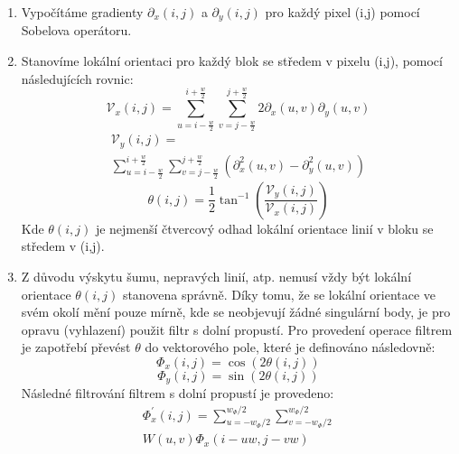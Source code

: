 \documentclass[a4paper,11pt]{article}
\begin{document}
\begin{multicols*}{2}
\begin{enumerate}
            \item Vypočítáme gradienty $\partial_{x}(i, j)$ a $\partial_{y}(i, j)$ pro každý pixel (i,j) pomocí Sobelova operátoru.
            \item Stanovíme lokální orientaci pro každý blok se středem v pixelu (i,j), pomocí následujících rovnic:
                \begin{equation} 
                    \mathcal{V}_{x}(i, j)=\sum_{u=i-\frac{w}{2}}^{i+\frac{w}{2}} \sum_{v=j-\frac{w}{2}}^{j+\frac{w}{2}} 2 \partial_{x}(u, v) \partial_{y}(u, v)
                \end{equation}
                \begin{equation} 
                    \begin{multlined}
                        \mathcal{V}_{y}(i, j)=\\\sum_{u=i-\frac{w}{2}}^{i+\frac{w}{2}} \sum_{v=j-\frac{w}{2}}^{j+\frac{w}{2}}\left(\partial_{x}^{2}(u, v)-\partial_{y}^{2}(u, v)\right)
                    \end{multlined}
                \end{equation}
                \begin{equation} 
                    \theta(i, j)=\frac{1}{2} \tan ^{-1}\left(\frac{\mathcal{V}_{y}(i, j)}{\mathcal{V}_{x}(i, j)}\right)
                \end{equation}
                 Kde $\theta(i, j)$ je nejmenší čtvercový odhad lokální orientace linií v bloku se středem v (i,j).
             \item Z důvodu výskytu šumu, nepravých linií, atp. nemusí vždy být lokální orientace $\theta(i, j)$ stanovena správně. Díky tomu, že se lokální orientace ve svém okolí mění pouze mírně, kde se neobjevují žádné singulární body, je pro opravu (vyhlazení) použit filtr s dolní propustí. Pro provedení operace filtrem je zapotřebí převést $\theta$ do vektorového pole, které je definováno následovně:
             \begin{equation}
                 \Phi_{x}(i, j)=\cos (2 \theta(i, j))
            \end{equation}   
            \begin{equation}
                 \Phi_{y}(i, j)=\sin (2 \theta(i, j))
             \end{equation}
             Následné filtrování filtrem s dolní propustí je provedeno:
             \begin{equation}
                 \begin{multlined}
                     \Phi_{x}^{\prime}(i, j)= \sum_{u=-w_{\Phi} / 2}^{w_{\Phi} / 2} \sum_{v=-w_{\Phi} / 2}^{w_{\Phi} / 2} \\ W(u, v) \Phi_{x}(i-u w, j-v w)

\end{multlined}
\end{equation}
\end{enumerate}
\end{multicols*}
\end{document}
